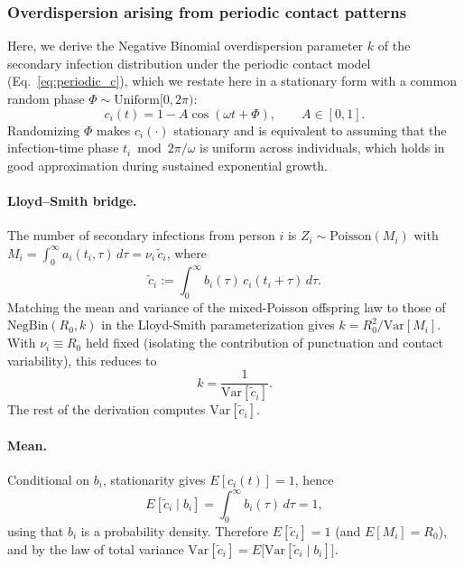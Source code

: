 \clearpage

\subsubsection*{Overdispersion arising from periodic contact patterns}

Here, we derive the Negative Binomial overdispersion parameter $k$ \citep{lloyd-smith_superspreading_2005} of the secondary infection distribution under the periodic contact model (Eq.~\ref{eq:periodic_c}), which we restate here in a stationary form with a common random phase $\Phi \sim \text{Uniform}[0, 2\pi)$:
%
\begin{equation}
	c_i(t) = 1 - A \cos(\omega t + \Phi), \qquad A \in [0,1].
	\label{eq:periodic_c_supp}
\end{equation}
%
Randomizing $\Phi$ makes $c_i(\cdot)$ stationary and is equivalent to assuming that the infection-time phase $t_i \bmod 2\pi/\omega$ is uniform across individuals, which holds in good approximation during sustained exponential growth.

\paragraph{Lloyd--Smith bridge.} The number of secondary infections from person $i$ is $Z_i \sim \text{Poisson}(M_i)$ with $M_i = \int_0^\infty a_i(t_i, \tau)\,d\tau = \nu_i\,\tilde{c}_i$, where
%
\begin{equation}
	\tilde{c}_i := \int_0^\infty b_i(\tau)\,c_i(t_i + \tau)\,d\tau.
	\label{eq:tilde_c_def}
\end{equation}
%
Matching the mean and variance of the mixed-Poisson offspring law to those of $\text{NegBin}(R_0, k)$ in the Lloyd-Smith parameterization gives $k = R_0^2/\text{Var}[M_i]$. With $\nu_i \equiv R_0$ held fixed (isolating the contribution of punctuation and contact variability), this reduces to
%
\begin{equation}
	k = \frac{1}{\text{Var}[\tilde{c}_i]}.
	\label{eq:k_bridge}
\end{equation}
%
The rest of the derivation computes $\text{Var}[\tilde{c}_i]$.

\paragraph{Mean.} Conditional on $b_i$, stationarity gives $E[c_i(t)] = 1$, hence
%
\begin{equation}
	E[\tilde{c}_i \mid b_i] = \int_0^\infty b_i(\tau)\,d\tau = 1,
\end{equation}
%
using that $b_i$ is a probability density. Therefore $E[\tilde{c}_i] = 1$ (and $E[M_i] = R_0$), and by the law of total variance $\text{Var}[\tilde{c}_i] = E\bigl[\text{Var}[\tilde{c}_i \mid b_i]\bigr]$.

